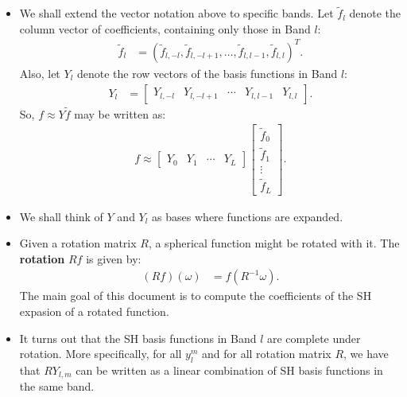 \documentclass[10pt]{article}
\begin{document}
\begin{itemize}
        \item We shall extend the vector notation above to specific bands.  Let $\tilde{f}_l$ denote the column vector of coefficients, containing only those in Band $l$:
        \begin{align*}
            \tilde{f}_l &= (\tilde{f}_{l,-l}, \tilde{f}_{l,-l+1}, \dotsc, \tilde{f}_{l,l-1}, \tilde{f}_{l,l})^T.
        \end{align*}
        Also, let $Y_l$ denote the row vectors of the basis functions in Band $l$:
        \begin{align*}
            Y_l &= \begin{bmatrix}
                Y_{l,-l} & Y_{l,-l+1} & \cdots & Y_{l,l-1} & Y_{l,l}
            \end{bmatrix}.
        \end{align*}
        So, $f \approx Y \tilde{f}$ may be written as:
        \begin{align*}
            f \approx 
            \left[ \begin{array}{c|c|c|c} Y_0 & Y_1 & \cdots & Y_L \end{array} \right]
            \left[ \begin{array}{c} 
                \tilde{f}_0 \\ \hline
                \tilde{f}_1 \\ \hline
                \vdots \\ \hline
                \tilde{f}_L 
            \end{array} \right].
        \end{align*}

        \item We shall think of $Y$ and $Y_l$ as bases where functions are expanded.

        \item Given a rotation matrix $R$, a spherical function might be rotated with it.  The \textbf{rotation} $Rf$ is given by:
        \begin{align*}
            (Rf)(\omega) &= f(R^{-1}\omega).
        \end{align*}
        The main goal of this document is to compute the coefficients of the SH expasion of a rotated function.

        \item It turns out that the SH basis functions in Band $l$ are complete under rotation.  More specifically, for all $y_l^m$ and for all rotation matrix $R$, we have that $RY_{l,m}$ can be written as a linear combination of SH basis functions in the same band.


\end{itemize}
\end{document}
